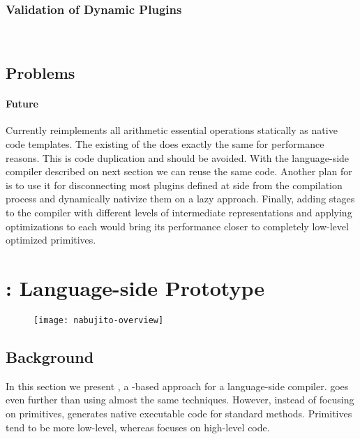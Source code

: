 \subsubsection*{Validation of Dynamic Plugins}

\\


\subsection{Problems}
\paragraph{\WF Future}
Currently \WF reimplements all \Slang arithmetic essential operations statically as native code templates.
The existing \JIT of the \PH \VM does exactly the same for performance reasons.
This is code duplication and should be avoided.
With the language-side \JIT compiler described on next section we can reuse the same code. Another plan for \WF is to use it for disconnecting most plugins defined at \Slang side from the \VM compilation process and dynamically nativize them on a lazy approach.
Finally, adding stages to the compiler with different levels of intermediate representations and applying optimizations to each would bring its performance closer to completely low-level optimized primitives.


\newpage
\section{\NBJ: Language-side \JIT Prototype}

\begin{figure}[h]
	\centering
	\texttt{[image: nabujito-overview]}
\end{figure}

\subsection{Background}
In this section we present \NBJ, a \B-based approach for a language-side \JIT compiler.
\NBJ goes even further than \WF using almost the same techniques.
However, instead of focusing on primitives, \NBJ generates native executable code for standard \ST methods.
Primitives tend to be more low-level, whereas \NBJ focuses on high-level \ST code. 


